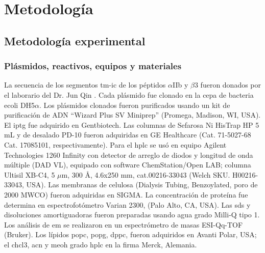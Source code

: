 \chapter{Metodología}\label{chap:metod}

\section{Metodología experimental}

\subsection{Plásmidos, reactivos, equipos y materiales}
La secuencia de los segmentos \ac{tm}-\ac{ic} de los péptidos $\alpha$IIb y $\beta$3 fueron donados por el laborario del Dr. Jun Qin \citep{Yang2009}. Cada plásmido fue clonado en la cepa de bacteria \ac{ecoli} DH5$\alpha$. Los plásmidos clonados fueron purificados usando un kit de purificación de ADN ``Wizard Plus SV Miniprep'' (Promega, Madison, WI, USA). El \ac{iptg} fue adquirido en Gentbiotech. Las  columnas  de Sefarosa Ni HisTrap HP  5 mL y de desalado PD-10 fueron adquiridas en GE Healthcare (Cat. 71-5027-68 Cat. 17085101, respectivamente). Para el \ac{hplc} se usó en equipo Agilent Technologies 1260 Infinity con detector de arreglo de diodos y longitud de onda múltiple (DAD VL), equipado con software ChemStation/Open LAB; columna Ultisil XB-C4, 5 $\mu$m, 300 Å, 4.6x250 mm, cat.00216-33043 (Welch SKU. H00216-33043, USA). Las membranas de celulosa (Dialysis Tubing, Benzoylated, poro de 2000 MWCO) fueron adquiridas en SIGMA. La concentración de proteína fue determina en espectrofotómetro Varian 2300, (Palo Alto, CA, USA). Las \ac{sds} y disoluciones amortiguadoras fueron preparadas usando agua grado Milli-Q tipo 1. Los análisis de \ac{em} se realizaron en un espectrómetro de masas ESI-Qq-TOF (Bruker). 
Los lípidos \ac{popc}, \ac{popg}, \ac{dppc}, fueron adquiridos en Avanti Polar, USA; el  \ac{chcl3}, \ac{acn} y \ac{meoh} grado \ac{hplc} en la firma Merck, Alemania.

